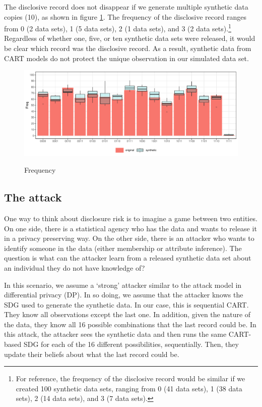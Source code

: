 \documentclass[runningheads]{llncs}
\begin{document}
The disclosive record does not disappear if we generate multiple synthetic data copies (10), as shown in figure \ref{fig:cart_histogram_compare_10}.  The frequency of the disclosive record ranges from 0 (2 data sets), 1 (5 data sets), 2 (1 data sets), and 3 (2 data sets).\footnote{For reference, the frequency of the disclosive record would be similar if we created 100 synthetic data sets, ranging from 0 (41 data sets), 1 (38 data sets), 2 (14 data sets), and 3 (7 data sets).}  Regardless of whether one, five, or ten synthetic data sets were released, it would be clear which record was the disclosive record.  As a result, synthetic data from CART models do not protect the unique observation in our simulated data set.  

\begin{figure}[!h]
    \centering
    \caption{Frequency}
    \includegraphics[width=\textwidth]{../graphs/graph_cart_histogram_compare_10_v1.pdf}
    \label{fig:cart_histogram_compare_10}
\end{figure}


\subsection{The attack}

One way to think about disclosure risk is to imagine a game between two entities.  On one side, there is a statistical agency who has the data and wants to release it in a privacy preserving way.  On the other side, there is an attacker who wants to identify someone in the data (either membership or attribute inference). The question is what can the attacker learn from a released synthetic data set about an individual they do not have knowledge of?

In this scenario, we assume a `strong' attacker similar to the attack model in differential privacy (DP).  In so doing, we assume that the attacker knows the SDG used to generate the synthetic data.  In our case, this is sequential CART.  They know all observations except the last one.  In addition, given the nature of the data, they know all 16 possible combinations that the last record could be.  In this attack, the attacker sees the synthetic data and then runs the same CART-based SDG for each of the 16 different possibilities, sequentially.  Then, they update their beliefs about what the last record could be.
\end{document}
